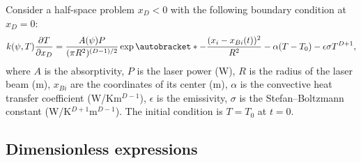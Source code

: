 \documentclass{article}
\newcommand{\pder}[2][]{\frac{\partial#1}{\partial#2}}
\DeclarePairedDelimiter\autobracket()       %
\newcommand{\br}[1]{\autobracket*{#1}}
\begin{document}
Consider a half-space problem \(x_D<0\) with the following boundary condition at \(x_D=0\):
\begin{equation}\label{eq:bc}
	k(\psi,T)\pder[T]{x_D} = \frac{A(\psi)P}{(\pi R^2)^{(D-1)/2}}\exp\br{ -\frac{(x_i-x_{Bi}(t))^2}{R^2} }
	    - \alpha(T-T_0) - \epsilon\sigma T^{D+1},
\end{equation}
where \(A\) is the absorptivity, \(P\) is the laser power (\si{W}), \(R\) is the radius of the laser beam (\si{m}),
\(x_{Bi}\) are the coordinates of its center (\si{m}), \(\alpha\) is the convective heat transfer coefficient (\si{W/Km}\(^{D-1}\)),
\(\epsilon\) is the emissivity, \(\sigma\) is the Stefan--Boltzmann constant (\si{W/K}\(^{D+1}\)\si{m}\(^{D-1}\)).
The initial condition is \(T=T_0\) at \(t=0\).

\subsection{Dimensionless expressions}
\end{document}
